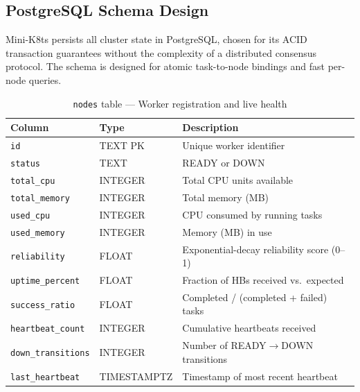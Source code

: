 \documentclass[11pt,a4paper]{article}
\begin{document}
\subsection{PostgreSQL Schema Design}

Mini-K8ts persists all cluster state in PostgreSQL, chosen for its ACID transaction
guarantees without the complexity of a distributed consensus protocol. The schema is
designed for atomic task-to-node bindings and fast per-node queries.

\begin{table}[H]
\centering
\caption{\texttt{nodes} table --- Worker registration and live health}
\label{tab:schema_nodes}
\begin{tabular}{@{} l l l @{}}
\toprule
\textbf{Column} & \textbf{Type} & \textbf{Description} \\
\midrule
\texttt{id}               & TEXT PK      & Unique worker identifier \\
\texttt{status}           & TEXT          & READY or DOWN \\
\texttt{total\_cpu}       & INTEGER       & Total CPU units available \\
\texttt{total\_memory}    & INTEGER       & Total memory (MB) \\
\texttt{used\_cpu}        & INTEGER       & CPU consumed by running tasks \\
\texttt{used\_memory}     & INTEGER       & Memory (MB) in use \\
\texttt{reliability}      & FLOAT         & Exponential-decay reliability score (0--1) \\
\texttt{uptime\_percent}  & FLOAT         & Fraction of HBs received vs.~expected \\
\texttt{success\_ratio}   & FLOAT         & Completed / (completed + failed) tasks \\
\texttt{heartbeat\_count} & INTEGER       & Cumulative heartbeats received \\
\texttt{down\_transitions}& INTEGER       & Number of READY$\to$DOWN transitions \\
\texttt{last\_heartbeat}  & TIMESTAMPTZ   & Timestamp of most recent heartbeat \\
\bottomrule
\end{tabular}
\end{table}
\end{document}
